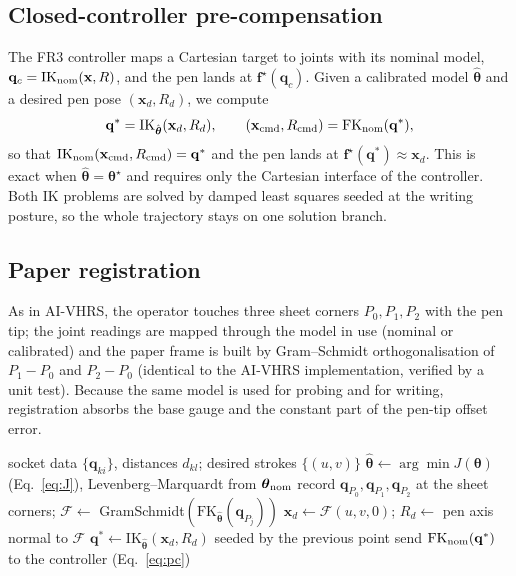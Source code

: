 \documentclass[conference]{IEEEtran}
\begin{document}
\subsection{Closed-controller pre-compensation}
The FR3 controller maps a Cartesian target to joints with its nominal model, $\mathbf q_c=\mathrm{IK}_{\rm nom}(\mathbf x,R)$,
and the pen lands at $\mathbf f^\star(\mathbf q_c)$. Given a calibrated model $\hat{\boldsymbol\theta}$ and a desired pen
pose $(\mathbf x_d,R_d)$, we compute
\begin{equation}
\mathbf q^\ast=\mathrm{IK}_{\hat{\boldsymbol\theta}}(\mathbf x_d,R_d),\qquad
(\mathbf x_{\rm cmd},R_{\rm cmd})=\mathrm{FK}_{\rm nom}(\mathbf q^\ast),\label{eq:pc}
\end{equation}
so that $\mathrm{IK}_{\rm nom}(\mathbf x_{\rm cmd},R_{\rm cmd})=\mathbf q^\ast$ and the pen lands at
$\mathbf f^\star(\mathbf q^\ast)\approx\mathbf x_d$. This is exact when $\hat{\boldsymbol\theta}=\boldsymbol\theta^\star$
and requires only the Cartesian interface of the controller. Both IK problems are solved by damped least squares seeded at
the writing posture, so the whole trajectory stays on one solution branch.

\subsection{Paper registration}
As in AI-VHRS, the operator touches three sheet corners $P_0,P_1,P_2$ with the pen tip; the joint readings are mapped through
the model in use (nominal or calibrated) and the paper frame is built by Gram--Schmidt orthogonalisation of $P_1-P_0$ and
$P_2-P_0$ (identical to the AI-VHRS implementation, verified by a unit test). Because the same model is used for probing and
for writing, registration absorbs the base gauge and the constant part of the pen-tip offset error.

\begin{algorithm}[t]
\caption{Calibration and pre-compensated writing}\label{alg:pc}
\begin{algorithmic}[1]
\Require socket data $\{\mathbf q_{ki}\}$, distances $d_{kl}$; desired strokes $\{(u,v)\}$
\State $\hat{\boldsymbol\theta}\gets\arg\min J(\boldsymbol\theta)$ (Eq.~\ref{eq:J}), Levenberg--Marquardt from $\boldsymbol\theta_{\rm nom}$
\State record $\mathbf q_{P_0},\mathbf q_{P_1},\mathbf q_{P_2}$ at the sheet corners; $\mathcal F\gets$ GramSchmidt$(\mathrm{FK}_{\hat{\boldsymbol\theta}}(\mathbf q_{P_j}))$
  \State $\mathbf x_d\gets\mathcal F(u,v,0)$; $R_d\gets$ pen axis normal to $\mathcal F$
  \State $\mathbf q^\ast\gets\mathrm{IK}_{\hat{\boldsymbol\theta}}(\mathbf x_d,R_d)$ seeded by the previous point
  \State send $\mathrm{FK}_{\rm nom}(\mathbf q^\ast)$ to the controller (Eq.~\ref{eq:pc})
\EndFor
\end{algorithmic}
\end{algorithm}
\end{document}
